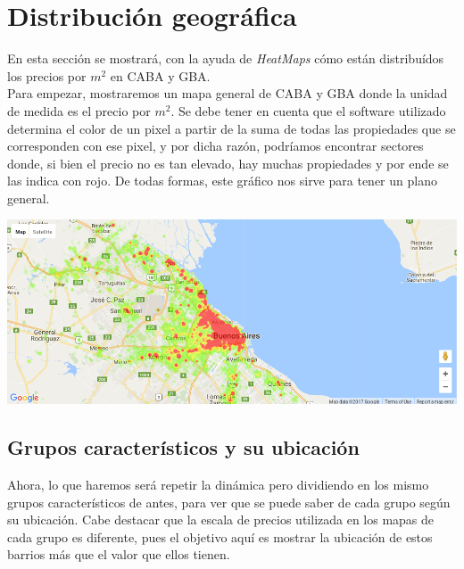 \documentclass[a4paper, 10pt]{article}
\newcommand\tab[1][0.5cm]{\hspace*{#1}}
\begin{document}
		\section{Distribución geográfica}
			En esta sección se mostrará, con la ayuda de \emph{HeatMaps} cómo están distribuídos los precios por $m^2$ en CABA
			y GBA. \\
			\tab Para empezar, mostraremos un mapa general de CABA y GBA donde la unidad de medida es el precio por $m^2$. Se
			debe tener en cuenta que el software utilizado determina el color de un pixel a partir de la suma de todas las
			propiedades que se corresponden con ese pixel, y por dicha razón, podríamos encontrar sectores donde, si bien el
			precio no es tan elevado, hay muchas propiedades y por ende se las indica con rojo. De todas formas, este gráfico
			nos sirve para tener un plano general.
			\begin{center}
				\includegraphics[width=\textwidth]{images/m2GeneralHeatMap}
		  	\end{center}
			\subsection{Grupos característicos y su ubicación}			
				Ahora, lo que haremos será repetir la dinámica pero dividiendo en los mismo grupos característicos de antes, para
				ver que se puede saber de cada grupo según su ubicación. Cabe destacar que la escala de precios utilizada en los
				mapas de cada grupo es diferente, pues el objetivo aquí es mostrar la ubicación de estos barrios más que el valor
				que ellos tienen.
\end{document}
